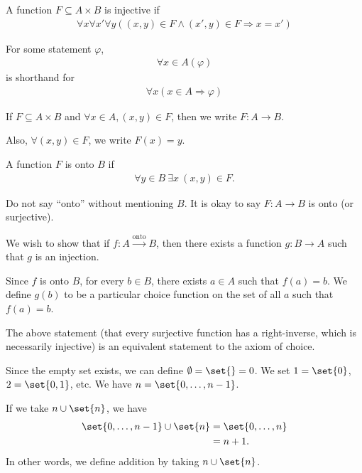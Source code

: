 \documentclass[10pt]{mypackage}
\begin{document}
\begin{definition}
  A function $F\subseteq A\times B$ is injective if
  \begin{align*}
    \forall x \forall x' \forall y \left((x,y)\in F \wedge (x',y)\in F \Rightarrow x=x'\right)
  \end{align*}
\end{definition}
\begin{notation}
  For some statement $\varphi$,
  \begin{align*}
    \forall x\in A \left(\varphi\right)
  \end{align*}
  is shorthand for
  \begin{align*}
    \forall x \left(x\in A \Rightarrow \varphi\right)
  \end{align*}
\end{notation}
\begin{notation}
  If $F\subseteq A\times B$ and $\forall x\in A, (x,y)\in F$, then we write $F: A\rightarrow B$.\newline

  Also, $\forall (x,y)\in F$, we write $F(x) = y$.
\end{notation}
\begin{definition}
  A function $F$ is onto $B$ if
  \begin{align*}
    \forall\! y\in\!B\: \exists x\: (x,y)\in F.
  \end{align*}
\end{definition}
\begin{remark}
Do not say ``onto'' without mentioning $B$. It is okay to say $F: A\rightarrow B$ is onto (or surjective).
\end{remark}
\begin{example}
  We wish to show that if $f: A\xrightarrow{\text{onto}} B$, then there exists a function $g: B\rightarrow A$ such that $g$ is an injection.\newline

  Since $f$ is onto $B$, for every $b\in B$, there exists $a\in A$ such that $f(a) = b$. We define $g(b)$ to be a particular choice function on the set of all $a$ such that $f(a) = b$.
\end{example}
\begin{remark}
The above statement (that every surjective function has a right-inverse, which is necessarily injective) is an equivalent statement to the axiom of choice.
\end{remark}
\begin{example}
  Since the empty set exists, we can define $\emptyset = \set{} = 0$. We set $1 = \set{0}$, $2 = \set{0,1}$, etc. We have $n = \set{0,\dots,n-1}$.\newline

  If we take $n\cup \set{n}$, we have
  \begin{align*}
    \set{0,\dots,n-1}\cup \set{n} &= \set{0,\dots,n}\\
                                  &= n+1.
  \end{align*}
  In other words, we define addition by taking $n\cup \set{n}$.
\end{example}
\end{document}
